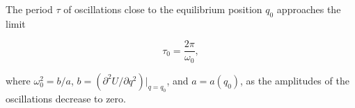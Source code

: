 The period $\tau$ of oscillations close to the equilibrium position $q_0$ approaches the limit

$$\tau_0 = \frac{2\pi}{\omega_0},$$

where $\omega_0^2 = b/a$, $b = (\partial^2 U / \partial q^2)|_{q=q_0}$, and $a = a(q_0)$, as the amplitudes of the oscillations decrease to zero.
